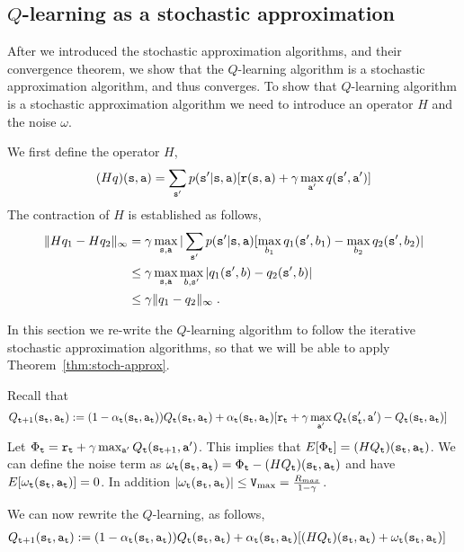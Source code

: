 \subsection{$Q$-learning as a stochastic approximation}

After we introduced the stochastic approximation algorithms, and
their convergence theorem, we show that the $Q$-learning algorithm
is a stochastic approximation algorithm, and thus converges.
%
To show that $Q$-learning algorithm is a stochastic approximation
algorithm we need to introduce an operator $H$ and the noise
$\omega$.

We first define the operator $H$,
\[
(Hq)({\tt s},{\tt a})=\sum_{{\tt s}'}p({\tt s}'|{\tt s},{\tt a})
[{\tt r}({\tt s},{\tt a}) + \gamma \max_{{\tt a}'} q ({\tt s}',
{\tt a}')]
\]
The contraction of $H$ is established as follows,
\begin{align*}
\|Hq_1-Hq_2\|_\infty &= \gamma \max_{{\tt s},{\tt a}}
|\sum_{{\tt s}'} p({\tt s}'|{\tt s},{\tt a})
[\max_{b_1} q_1({\tt s}',b_1)-\max_{b_2} q_2({\tt s}',b_2)|\\
&\leq \gamma \max_{{\tt s},{\tt a}}\max_{b,{\tt s}'} |q_1({\tt s}',b)-q_2({\tt s}',b)|\\
&\leq \gamma \|q_1-q_2\|_\infty\;.
\end{align*}


In this section we re-write the $Q$-learning algorithm to follow the
iterative stochastic approximation algorithms, so that we will be
able to apply Theorem~\ref{thm:stoch-approx}.

Recall that
\begin{align*}
 Q_{{\tt t}+1}({\tt s}_{\tt t},{\tt a}_{\tt t}) & :=   (1-\alpha_{\tt t}({\tt s}_{\tt t},{\tt a}_{\tt t}) ) Q_{\tt t} ({\tt s}_{\tt t},{\tt a}_{\tt t}) + \alpha_{\tt t}({\tt s}_{\tt t},{\tt a}_{\tt t})  [{\tt r}_{\tt t} +
\gamma \max_{{\tt a}'} Q_{\tt t} ({\tt s}_{{\tt t}}',
{\tt a}')-Q_{\tt t} ({\tt s}_{\tt t},{\tt a}_{\tt t}) ]
\end{align*}
Let $\Phi_{\tt t}={\tt r}_{\tt t} + \gamma \max_{{\tt a}'} Q_{\tt t}
({\tt s}_{{\tt t}+1}, {\tt a}')$. This implies that $E[\Phi_{\tt t}]=
(HQ_{\tt t})({\tt s}_{\tt t},{\tt a}_{\tt t})$. We can define the noise
term as
$\omega_{\tt t}({\tt s}_{\tt t},{\tt a}_{\tt t})=\Phi_{\tt t}-(HQ_{\tt t})({\tt s}_{\tt t},{\tt a}_{\tt t})$
and have $E[\omega_{\tt t}({\tt s}_{\tt t},{\tt a}_{\tt t})]=0$. In
addition $|\omega_{\tt t}({\tt s}_{\tt t},{\tt a}_{\tt t})|\leq {\tt V}_{\max }=
\frac{R_{max}}{1-\gamma}$.

We can now rewrite the $Q$-learning, as follows,
\begin{align*}
 Q_{{\tt t}+1}({\tt s}_{\tt t},{\tt a}_{\tt t}) & :=   (1-\alpha_{\tt t}({\tt s}_{\tt t},{\tt a}_{\tt t}) ) Q_{\tt t} ({\tt s}_{\tt t},{\tt a}_{\tt t}) + \alpha_{\tt t}({\tt s}_{\tt t},{\tt a}_{\tt t})
 [(HQ_{\tt t})({\tt s}_{\tt t},{\tt a}_{\tt t})+\omega_{\tt t}({\tt s}_{\tt t},{\tt a}_{\tt t})]
\end{align*}

